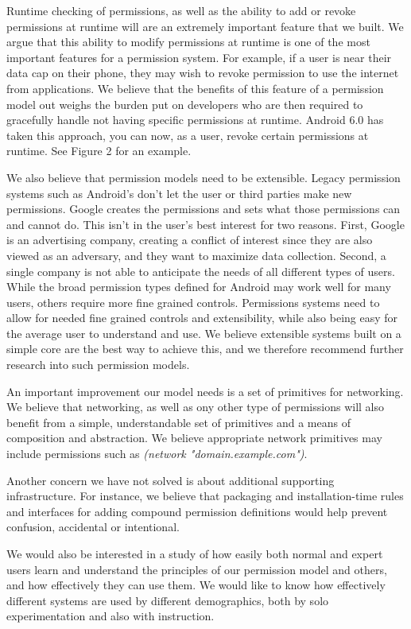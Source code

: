 Runtime checking of permissions, as well as the ability to add or revoke permissions at runtime will are an extremely important feature that we built. We argue that this ability to modify permissions at runtime is one of the most important features for a permission system. For example, if a user is near their data cap on their phone, they may wish to revoke permission to use the internet from applications. We believe that the benefits of this feature of a permission model out weighs the burden put on developers who are then required to gracefully handle not having specific permissions at runtime. Android 6.0 has taken this approach\cite{android}, you can now, as a user, revoke certain permissions at runtime. See Figure 2 for an example.

We also believe that permission models need to be extensible.
Legacy permission systems such as Android's don't let the user or third parties make new permissions. 
Google creates the permissions and sets what those permissions can and cannot do. 
This isn't in the user's best interest for two reasons. 
First, Google is an advertising company, creating a conflict of interest since they are also viewed as an adversary, and they want to maximize data collection.  
Second, a single company is not able to anticipate the needs of all different types of users.  While the broad permission types defined for Android may work well for many users, others require more fine grained controls.
Permissions systems need to allow for needed fine grained controls and extensibility, while also being easy for the average user to understand and use.
We believe extensible systems built on a simple core are the best way to achieve this, and we therefore recommend further research into such permission models.

An important improvement our model needs is a set of primitives for networking.  We believe that networking, as well as ony other type of permissions will also benefit from a simple, understandable set of primitives and a means of composition and abstraction.  We believe appropriate network primitives may include permissions such as \textit{(network "domain.example.com")}.

Another concern we have not solved is about additional supporting infrastructure.  For instance, we believe that packaging and installation-time rules and interfaces for adding compound permission definitions would help prevent confusion, accidental or intentional.

We would also be interested in a study of how easily both normal and expert users learn and understand the principles of our permission model and others, and how effectively they can use them.  
We would like to know how effectively different systems are used by different demographics, both by solo experimentation and also with instruction.



